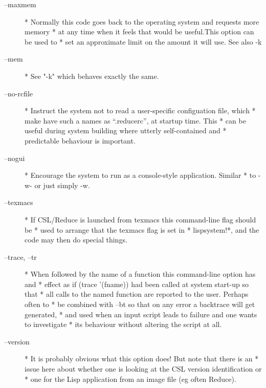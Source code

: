 \documentclass[a4paper,11pt]{article}
\begin{document}
\begin{description}
\item [{\ttfamily --maxmem}] 
          * Normally this code goes back to the operating system and requests more memory
          * at any time when it feels that would be useful.This option can be used to
          * set an approximate limit on the amount it will use. See also -k

\item [{\ttfamily --mem}] 
          * See "-k" which behaves exactly the same.

\item [{\ttfamily --no-rcfile}] 
          * Instruct the system not to read a user-specific configuation file, which
          * make have such a names as ``{\ttfamily .reducerc}'', at startup time. This
          * can be useful during system building where utterly self-contained and
          * predictable behaviour is important.

\item [{\ttfamily --nogui}] 
          * Encourage the system to run as a console-style application. Similar
          * to {\ttfamily -w-} or just simply {\ttfamily -w}.

\item [{\ttfamily --texmacs}] 
          * If CSL/Reduce is launched from texmacs this command-line flag should be
          * used to arrange that the {\ttfamily texmacs} flag is set in
          * {\ttfamily lispsystem!*}, and the code may then do special things.

\item [{\ttfamily --trace, --tr}] 
          * When followed by the name of a function this command-line option has and
          * effect as if (trace '(fname)) had been called at system start-up so that
          * all calls to the named function are reported to the user. Perhaps often to
          * be combined with --bt so that on any error a backtrace will get generated,
          * and used when an input script leads to failure and one wants to investigate
          * its behaviour without altering the script at all.

\item [{\ttfamily --version}] 
          * It is probably obvious what this option does! But note that there is an
          * issue here about whether one is looking at the CSL version identification or
          * one for the Lisp application from an image file (eg often Reduce).


\end{description}
\end{document}
